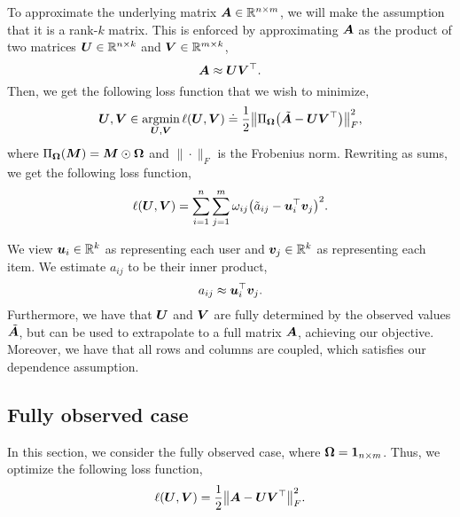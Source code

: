 To approximate the underlying matrix $\bm{A} \in \mathbb{R}^{n \times m}$, we will make the assumption
that it is a rank-$k$ matrix. This is enforced by approximating $\bm{A}$ as the product of two
matrices $\bm{U} \in \mathbb{R}^{n \times k}$ and $\bm{V} \in \mathbb{R}^{m \times k}$, \[
    \bm{A} \approx \bm{U} \bm{V}^\top.
\]
Then, we get the following loss function that we wish to minimize, \[
    \mat{U}, \mat{V} \in \argmin_{\mat{U}, \mat{V}} \ell(\mat{U}, \mat{V}) \doteq \frac{1}{2} \lft\| \Pi_{\mat{\Omega}} \lft( \tilde{\mat{A}} - \mat{U}\transpose{\mat{V}} \rgt) \rgt\|_F^2,
\]
where $\Pi_{\bm{\Omega}}(\bm{M}) = \bm{M} \odot \bm{\Omega}$ and $\| \cdot \|_F$ is the
Frobenius norm. Rewriting as sums, we get the following loss function, \[
    \ell(\mat{U}, \mat{V}) = \sum_{i=1}^{n} \sum_{j=1}^{m} \omega_{ij} \lft( \tilde{a}_{ij} - \transpose{\vec{u}_i} \vec{v}_j \rgt)^2.
\]

\begin{important}
    We view $\bm{u}_i \in \mathbb{R}^k$ as representing each user and $\bm{v}_j \in \mathbb{R}^k$ as
    representing each item. We estimate $a_{ij}$ to be their inner product, \[
        a_{ij} \approx \bm{u}_i^\top \bm{v}_j.
    \]
    Furthermore, we have that $\bm{U}$ and $\bm{V}$ are fully determined by the observed values
    $\tilde{\bm{A}}$, but can be used to extrapolate to a full matrix $\bm{A}$, achieving our
    objective. Moreover, we have that all rows and columns are coupled, which satisfies our dependence
    assumption.
\end{important}

\subsection{Fully observed case}

In this section, we consider the fully observed case, where $\bm{\Omega} = \bm{1}_{n \times m}$.
Thus, we optimize \wrt the following loss function, \[
    \ell(\mat{U}, \mat{V}) = \frac{1}{2} \lft\| \mat{A} - \mat{U}\transpose{\mat{V}} \rgt\|_F^2.
\]

